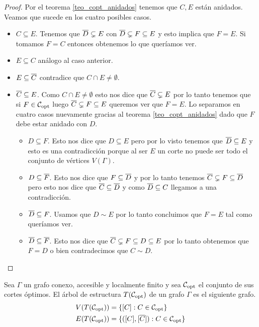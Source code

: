 \documentclass[tesis.tex]{subfiles}
\begin{document}
\begin{proof}
	Por el teorema \ref{teo_copt_anidados} tenemos que $C,E$ están anidados.
	Veamos que sucede en los cuatro posibles casos.
	\begin{itemize}
		\item $C \subseteq E$. 
		Tenemos que $\overline D \subsetneq E$ con $\overline D \subsetneq F \subseteq E$ y esto implica que $F=E$.
		Si tomamos $F = C$ entonces obtenemos lo que queríamos ver.
		\item $E \subseteq C$ análogo al caso anterior.
		\item $E \subseteq \overline C$ contradice que $C \cap E \neq \emptyset$.
		\item $\overline C \subseteq E$.
		Como $C \cap E \neq \emptyset$ esto nos dice que $\overline C \subsetneq E$ por lo tanto tenemos que si $F \in {\cal C}_{\text{opt}}$ luego	$\overline C \subsetneq F \subseteq E$ queremos ver que $F=E$.
		Lo separamos en cuatro casos nuevamente gracias al teorema \ref{teo_copt_anidados} dado que $F$ debe estar anidado con $D$.
		\begin{itemize}
			\item $D \subseteq F$.
			Esto nos dice que $D \subseteq E$ pero por lo visto tenemos que $\overline D \subseteq E$ y esto es una contradicción porque al ser $E$ un corte no puede ser todo el conjunto de vértices $V(\Gamma)$.
			\item $D \subseteq \overline F$. 
			Esto nos dice que $F \subseteq \overline D$ y por lo tanto tenemos $\overline C \subsetneq F \subseteq \overline D$ pero esto nos dice que $\overline C \subseteq \overline D$ y como $\overline D \subseteq C$ llegamos a una contradicción.
			\item $\overline D \subseteq F$.
			Usamos que $D \sim E$ por lo tanto concluimos que $F=E$ tal como queríamos ver.			
			\item $\overline D \subseteq \overline F$.
			Esto nos dice que $\overline C \subsetneq F \subseteq D \subseteq E$ por lo tanto obtenemos que $F = D$ o bien contradecimos que $C \sim D$.
		\end{itemize}
	\end{itemize}
\end{proof}

\begin{deff}
	Sea $\Gamma$ un grafo conexo, accesible y localmente finito y sea ${\cal C}_{\text{opt}}$ el conjunto de sus cortes óptimos.
	El árbol de estructura $T({\cal C}_{\text{opt}})$ de un grafo $\Gamma$ es el siguiente grafo.
	\begin{align*}
		V(T({\cal C}_{\text{opt}})) &= \{ [C] : C \in {\cal C}_{\text{opt}} \} \\
		E(T({\cal C}_{\text{opt}})) &= \{ ([C], [\overline C]) : C \in {\cal C}_{\text{opt}}   \}
	\end{align*}
\end{deff}
\end{document}
